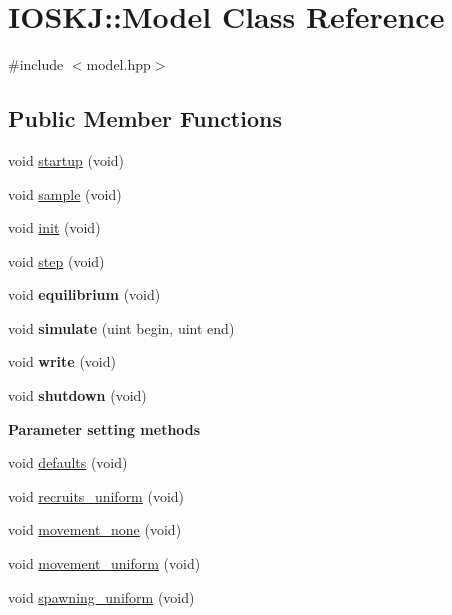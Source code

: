 \hypertarget{classIOSKJ_1_1Model}{\section{I\-O\-S\-K\-J\-:\-:Model Class Reference}
\label{classIOSKJ_1_1Model}
}


{\ttfamily \#include $<$model.\-hpp$>$}

\subsection*{Public Member Functions}
\begin{DoxyCompactItemize}
\item 
void \hyperlink{classIOSKJ_1_1Model_a6f42bfc7352faa7bba7e00d04fc166b0}{startup} (void)
\item 
void \hyperlink{classIOSKJ_1_1Model_a242ba7c47871099bf4bed482d262cede}{sample} (void)
\item 
void \hyperlink{classIOSKJ_1_1Model_af64274ff5991d11e1c232618af8de800}{init} (void)
\item 
void \hyperlink{classIOSKJ_1_1Model_af163ebda22001c7df308dc227c1687bb}{step} (void)
\item 
\hypertarget{classIOSKJ_1_1Model_a58e460b456d7affc4f6a8af785f6e82c}{void {\bfseries equilibrium} (void)}\label{classIOSKJ_1_1Model_a58e460b456d7affc4f6a8af785f6e82c}

\item 
\hypertarget{classIOSKJ_1_1Model_a6bf9c91a1ad6d785f935acdf44445367}{void {\bfseries simulate} (uint begin, uint end)}\label{classIOSKJ_1_1Model_a6bf9c91a1ad6d785f935acdf44445367}

\item 
\hypertarget{classIOSKJ_1_1Model_abfc09c1b2d6bfe2802835cd5fd58c3b3}{void {\bfseries write} (void)}\label{classIOSKJ_1_1Model_abfc09c1b2d6bfe2802835cd5fd58c3b3}

\item 
\hypertarget{classIOSKJ_1_1Model_a343216d7c9019f15f01f205423001005}{void {\bfseries shutdown} (void)}\label{classIOSKJ_1_1Model_a343216d7c9019f15f01f205423001005}

\end{DoxyCompactItemize}
\begin{Indent}{\bf Parameter setting methods}\par
\begin{DoxyCompactItemize}
\item 
void \hyperlink{classIOSKJ_1_1Model_a2018db7a3e7780fddc161f026dd35c4e}{defaults} (void)
\item 
void \hyperlink{classIOSKJ_1_1Model_ae74437cf19859e4f38dd50b6edf958b4}{recruits\-\_\-uniform} (void)
\item 
void \hyperlink{classIOSKJ_1_1Model_ac65da2c311c6b0a840755af4d3ec17ea}{movement\-\_\-none} (void)
\item 
void \hyperlink{classIOSKJ_1_1Model_a0278c3e4893f0891856dc4df93d3306f}{movement\-\_\-uniform} (void)
\item 
void \hyperlink{classIOSKJ_1_1Model_ae04fad38e291a476bec70ff67bbfd9b6}{spawning\-\_\-uniform} (void)
\end{DoxyCompactItemize}
\end{Indent}
